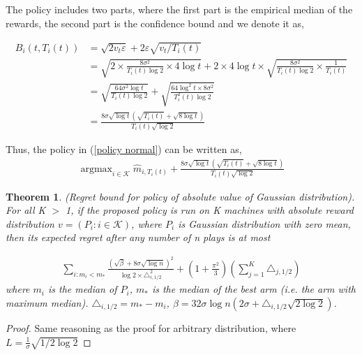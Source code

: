 \documentclass{article}
\DeclareMathOperator*{\argmax}{argmax}
\theoremstyle{plain}
\newtheorem{theo}{Theorem}
\begin{document}
The policy includes two parts, where the first part is the empirical median of the rewards, the second part is the confidence bound and we denote it as,

\begin{align}
\label{B_i(i, T_i(t)) definition}
B_i(t, T_i(t)) &= \sqrt{2v_t \varepsilon} + 2 \varepsilon \sqrt{v_t/T_i(t)}\\
&= \sqrt{2 \times \frac{8\sigma^2}{T_i(t)  \log 2} \times 4 \log t} + 2 \times 4 \log t \times \sqrt{\frac{8\sigma^2}{T_i(t)  \log 2} \times \frac{1}{T_i(t)}}\\
&= \sqrt{\frac{64 \sigma^2 \log t  }{T_i(t) \log 2}} + \sqrt{\frac{64 \log^2 t \times 8 \sigma^2}{T_i^2(t) \log 2}}\\
\label{B_i(i, T_i(t)) definition 2}
&= \frac{8 \sigma \sqrt{\log t} (\sqrt{ T_i(t)} + \sqrt{8\log t})}{ T_i(t)  \sqrt{\log 2}}
\end{align}

Thus, the policy in (\ref{policy normal}) can be written as,
\begin{align}
    \argmax_{i \in \mathcal{K}} \hat{m}_{i, T_i(t)} + \frac{8 \sigma \sqrt{\log t} (\sqrt{ T_i(t)} + \sqrt{8\log t})}{ T_i(t)  \sqrt{\log 2}}
\end{align}

\begin{theo}
(Regret bound for policy of absolute value of Gaussian distribution). \\

For all K $>$ 1, if the proposed policy is run on K machines with absolute reward distribution $v = (P_i: i \in \mathcal{K})$, where $P_i$ is Gaussian distribution with zero mean, then its expected regret after any number of n plays is at most 

\begin{align}
    \sum_{i: m_i < m_\ast} \frac{(\sqrt{\beta} + 8 \sigma \sqrt{\log n})^2}{\log 2 \times \triangle_{i, 1/2}^2}  + (1 + \frac{\pi^2}{3}) (\sum_{j=1}^K \triangle_{j, 1/2}) 
\end{align}
where $m_i$ is the median of $P_i$, $m_\ast$ is the median of the best arm (i.e. the arm with maximum median). $\triangle_{i, 1/2} = m_\ast - m_i$, $\beta = 32 \sigma \log n (2 \sigma + \triangle_{i,1/2} \sqrt{2 \log 2} )$. 
\end{theo}

\begin{proof}
Same reasoning as the proof for arbitrary distribution, where $L = \frac{1}{\sigma} \sqrt{1/2 \log 2}$


   
\end{proof}
\end{document}
